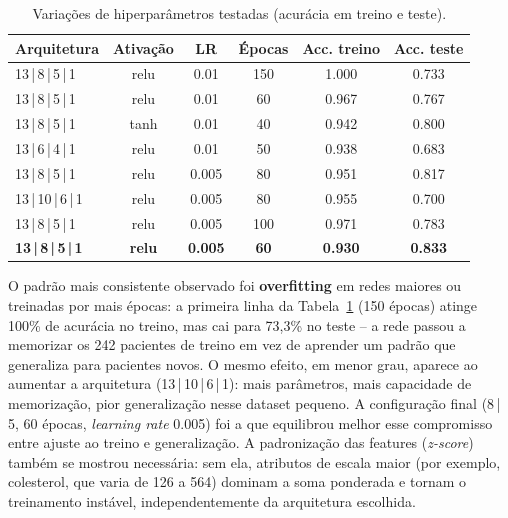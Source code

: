 \begin{table}[htbp]
    \centering
    \caption{Variações de hiperparâmetros testadas (acurácia em treino e teste).}
    \label{tab:variacoes}
    \begin{tabular}{lccccc}
        \toprule
        Arquitetura & Ativação & LR & Épocas & Acc. treino & Acc. teste \\
        \midrule
        13\,|\,8\,|\,5\,|\,1  & relu & 0.01  & 150 & 1.000 & 0.733 \\
        13\,|\,8\,|\,5\,|\,1  & relu & 0.01  & 60  & 0.967 & 0.767 \\
        13\,|\,8\,|\,5\,|\,1  & tanh & 0.01  & 40  & 0.942 & 0.800 \\
        13\,|\,6\,|\,4\,|\,1  & relu & 0.01  & 50  & 0.938 & 0.683 \\
        13\,|\,8\,|\,5\,|\,1  & relu & 0.005 & 80  & 0.951 & 0.817 \\
        13\,|\,10\,|\,6\,|\,1 & relu & 0.005 & 80  & 0.955 & 0.700 \\
        13\,|\,8\,|\,5\,|\,1  & relu & 0.005 & 100 & 0.971 & 0.783 \\
        \textbf{13\,|\,8\,|\,5\,|\,1}  & \textbf{relu} & \textbf{0.005} & \textbf{60}  & \textbf{0.930} & \textbf{0.833} \\
        \bottomrule
    \end{tabular}
\end{table}

O padrão mais consistente observado foi \textbf{overfitting} em redes
maiores ou treinadas por mais épocas: a primeira linha da
Tabela~\ref{tab:variacoes} (150 épocas) atinge 100\% de acurácia no
treino, mas cai para 73,3\% no teste -- a rede passou a memorizar os
242 pacientes de treino em vez de aprender um padrão que generaliza para
pacientes novos. O mesmo efeito, em menor grau, aparece ao aumentar a
arquitetura (13\,|\,10\,|\,6\,|\,1): mais parâmetros, mais capacidade de
memorização, pior generalização nesse dataset pequeno. A configuração
final (8\,|\,5, 60 épocas, \textit{learning rate} 0.005) foi a que
equilibrou melhor esse compromisso entre ajuste ao treino e generalização.
A padronização das features (\textit{z-score}) também se mostrou
necessária: sem ela, atributos de escala maior (por exemplo, colesterol,
que varia de 126 a 564) dominam a soma ponderada e tornam o treinamento
instável, independentemente da arquitetura escolhida.
